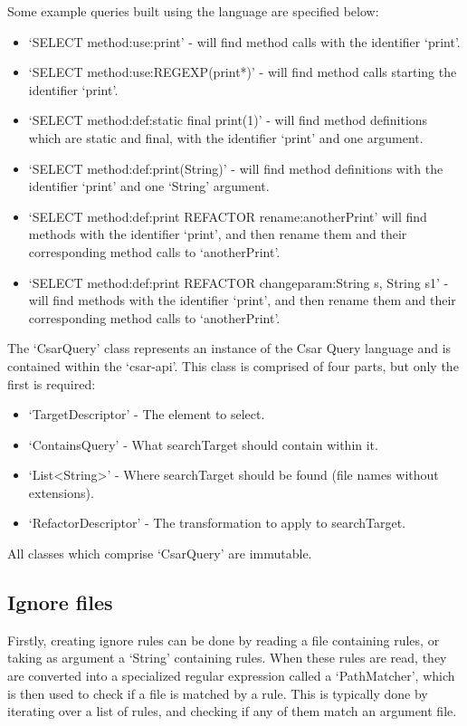 \documentclass[12pt, letterpaper]{article}
\begin{document}
Some example queries built using the language are specified below:
\begin{itemize}
  \item `SELECT method:use:print' - will find method calls with the identifier `print'.
  \item `SELECT method:use:REGEXP(print*)' - will find method calls starting the identifier `print'.
  \item `SELECT method:def:static final print(1)' - will find method definitions which are static and final, with the identifier `print' and one argument.
  \item `SELECT method:def:print(String)' - will find method definitions with the identifier `print' and one `String' argument.
  \item `SELECT method:def:print REFACTOR rename:anotherPrint' will find methods with the identifier `print', and then rename them and their corresponding method calls to `anotherPrint'.
  \item `SELECT method:def:print REFACTOR changeparam:String s, String s1' - will find methods with the identifier `print', and then rename them and their corresponding method calls to `anotherPrint'.
\end{itemize}

The `CsarQuery' class represents an instance of the Csar Query language and is contained within the `csar-api'.
This class is comprised of four parts, but only the first is required:
\begin{itemize}
  \item `TargetDescriptor' - The element to select.
  \item `ContainsQuery' - What searchTarget should contain within it.
  \item `List<String>' - Where searchTarget should be found (file names without extensions).
  \item `RefactorDescriptor' - The transformation to apply to searchTarget.
\end{itemize}

All classes which comprise `CsarQuery' are immutable.

\subsection{Ignore files}
Firstly, creating ignore rules can be done by reading a file containing rules, or taking as argument a `String' containing rules.
When these rules are read, they are converted into a specialized regular expression called a `PathMatcher', which is then used to check if a file is matched by a rule.
This is typically done by iterating over a list of rules, and checking if any of them match an argument file.
\end{document}
